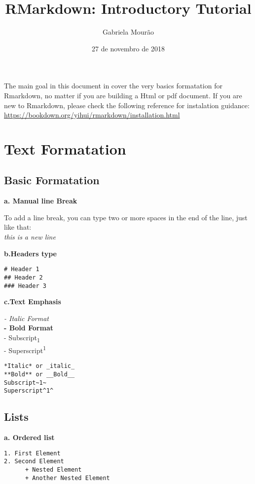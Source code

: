 \documentclass[]{article}
\title{RMarkdown: Introductory Tutorial}
\author{Gabriela Mourão}
\date{27 de novembro de 2018}
\begin{document}
\maketitle

{
\setcounter{tocdepth}{2}
\tableofcontents
}
 The main goal in this document in cover the very basics formatation for
Rmarkdown, no matter if you are building a Html or pdf document. If you
are new to Rmarkdown, please check the following reference for
instalation guidance:
\url{https://bookdown.org/yihui/rmarkdown/installation.html}

\section{Text Formatation}\label{text-formatation}

\subsection{Basic Formatation}\label{basic-formatation}

\textbf{a. Manual line Break}

To add a line break, you can type two or more spaces in the end of the
line, just like that:\\
\emph{this is a new line}

\textbf{b.Headers type}

\begin{verbatim}
# Header 1
## Header 2
### Header 3
\end{verbatim}

\textbf{c.Text Emphasis}

\emph{- Italic Format}\\
\textbf{- Bold Format}\\
- Subscript\textsubscript{1}\\
- Superscript\textsuperscript{1}

\begin{verbatim}
*Italic* or _italic_
**Bold** or __Bold__
Subscript~1~
Superscript^1^
\end{verbatim}

\subsection{Lists}\label{lists}

\textbf{a. Ordered list}

\begin{verbatim}
1. First Element
2. Second Element
      + Nested Element
      + Another Nested Element
\end{verbatim}
\end{document}
